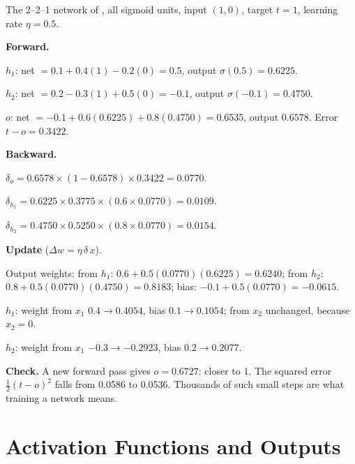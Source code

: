 \begin{worked}
The 2--2--1 network of , all sigmoid units, input $(1, 0)$, target
$t = 1$, learning rate $\eta = 0.5$.

\smallskip
\textbf{Forward.}
\begin{tight}
  \item $h_1$: net $= 0.1 + 0.4(1) - 0.2(0) = 0.5$, output $\sigma(0.5) = 0.6225$.
  \item $h_2$: net $= 0.2 - 0.3(1) + 0.5(0) = -0.1$, output $\sigma(-0.1) = 0.4750$.
  \item $o$: net $= -0.1 + 0.6(0.6225) + 0.8(0.4750) = 0.6535$, output $\mathbf{0.6578}$.
        Error $t - o = 0.3422$.
\end{tight}
\textbf{Backward.}
\begin{tight}
  \item $\delta_o = 0.6578 \times (1 - 0.6578) \times 0.3422 = \mathbf{0.0770}$.
  \item $\delta_{h_1} = 0.6225 \times 0.3775 \times (0.6 \times 0.0770) = \mathbf{0.0109}$.
  \item $\delta_{h_2} = 0.4750 \times 0.5250 \times (0.8 \times 0.0770) = \mathbf{0.0154}$.
\end{tight}
\textbf{Update} ($\Delta w = \eta\,\delta\,x$).
\begin{tight}
  \item Output weights: from $h_1$: $0.6 + 0.5(0.0770)(0.6225) = 0.6240$; from $h_2$:
        $0.8 + 0.5(0.0770)(0.4750) = 0.8183$; bias: $-0.1 + 0.5(0.0770) = -0.0615$.
  \item $h_1$: weight from $x_1$ $0.4 \to 0.4054$, bias $0.1 \to 0.1054$; from $x_2$
        unchanged, because $x_2 = 0$.
  \item $h_2$: weight from $x_1$ $-0.3 \to -0.2923$, bias $0.2 \to 0.2077$.
\end{tight}
\textbf{Check.} A new forward pass gives $o = 0.6727$: closer to 1. The squared error
$\tfrac{1}{2}(t - o)^2$ falls from 0.0586 to 0.0536. Thousands of such small steps
are what training a network means.
\end{worked}

\section{Activation Functions and Outputs}

